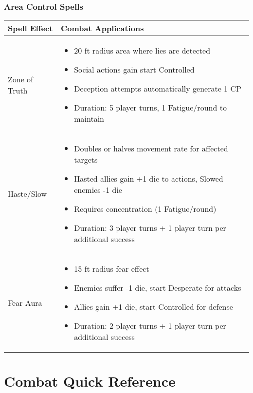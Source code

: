 \subsubsection{Area Control Spells}
\begin{longtable}{|>{\raggedright\arraybackslash}p{4cm}|>{\raggedright\arraybackslash}p{8cm}|}
\hline
\textbf{Spell Effect} & \textbf{Combat Applications} \\
\hline
Zone of Truth & 
\begin{itemize}
    \item 20 ft radius area where lies are detected
    \item Social actions gain start Controlled
    \item Deception attempts automatically generate 1 CP
    \item Duration: 5 player turns, 1 Fatigue/round to maintain
\end{itemize} \\
\hline
Haste/Slow & 
\begin{itemize}
    \item Doubles or halves movement rate for affected targets
    \item Hasted allies gain +1 die to actions, Slowed enemies -1 die
    \item Requires concentration (1 Fatigue/round)
    \item Duration: 3 player turns + 1 player turn per additional success
\end{itemize} \\
\hline
Fear Aura & 
\begin{itemize}
    \item 15 ft radius fear effect
    \item Enemies suffer -1 die, start Desperate for attacks
    \item Allies gain +1 die, start Controlled for defense
    \item Duration: 2 player turns + 1 player turn per additional success
\end{itemize} \\
\hline
\end{longtable}

\newpage

\section{Combat Quick Reference}

